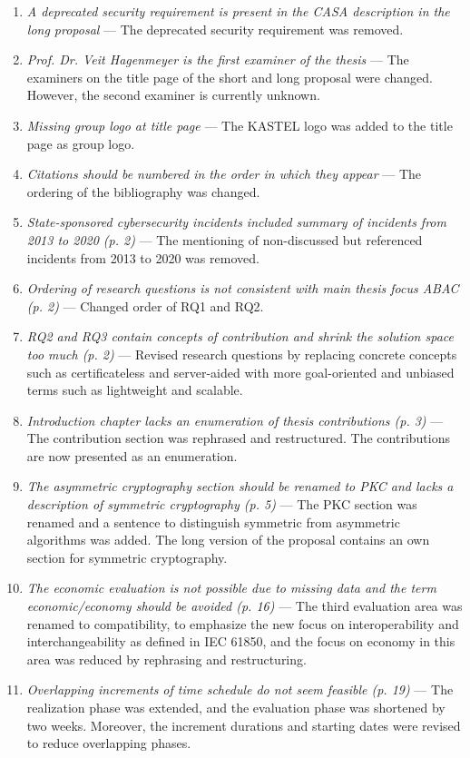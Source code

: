 \begin{enumerate}[label=Q\arabic*.]
    \item \textit{A deprecated security requirement is present in the CASA description in the long proposal} --- The deprecated security requirement was removed.
    \item \textit{Prof. Dr. Veit Hagenmeyer is the first examiner of the thesis} --- The examiners on the title page of the short and long proposal were changed. However, the second examiner is currently unknown.
    \item \textit{Missing group logo at title page} --- The KASTEL logo was added to the title page as group logo.
    \item \textit{Citations should be numbered in the order in which they appear} --- The ordering of the bibliography was changed.
    \item \textit{State-sponsored cybersecurity incidents included summary of incidents from 2013 to 2020 (p. 2)} --- The mentioning of non-discussed but referenced incidents from 2013 to 2020 was removed.
    \item \textit{Ordering of research questions is not consistent with main thesis focus ABAC (p. 2)} --- Changed order of RQ1 and RQ2.
    \item \textit{RQ2 and RQ3 contain concepts of contribution and shrink the solution space too much (p. 2)} --- Revised research questions by replacing concrete concepts such as certificateless and server-aided with more goal-oriented and unbiased terms such as lightweight and scalable.
    \item \textit{Introduction chapter lacks an enumeration of thesis contributions (p. 3)} --- The contribution section was rephrased and restructured. The contributions are now presented as an enumeration.
    \item \textit{The asymmetric cryptography section should be renamed to PKC and lacks a description of symmetric cryptography (p. 5)} --- The PKC section was renamed and a sentence to distinguish symmetric from asymmetric algorithms was added. The long version of the proposal contains an own section for symmetric cryptography.
    \item \textit{The economic evaluation is not possible due to missing data and the term economic/economy should be avoided (p. 16)} --- The third evaluation area was renamed to compatibility, to emphasize the new focus on interoperability and interchangeability as defined in IEC 61850, and the focus on economy in this area was reduced by rephrasing and restructuring.
    \item \textit{Overlapping increments of time schedule do not seem feasible (p. 19)} --- The realization phase was extended, and the evaluation phase was shortened by two weeks. Moreover, the increment durations and starting dates were revised to reduce overlapping phases.
\end{enumerate}
